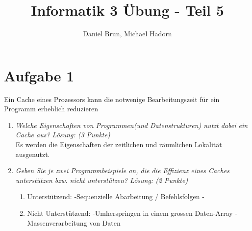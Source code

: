 \documentclass[10pt]{article}
\title{Informatik 3 Übung - Teil 5\vspace{-2ex}}
\author{Daniel Brun, Michael Hadorn\vspace{-2ex}}
\begin{document}
\maketitle

\section*{Aufgabe 1}
Ein Cache eines Prozessors kann die notwenige Bearbeitungszeit für ein Programm erheblich reduzieren
\begin{enumerate}[label=\alph*)]
	\item
		\textit{Welche Eigenschaften von Programmen(und Datenstrukturen) nutzt dabei ein Cache aus? Lösung: (3 Punkte)}\\
		Es werden die Eigenschaften der zeitlichen und räumlichen Lokalität ausgenutzt.
		
		\item 
		\textit{Geben Sie je zwei Programmbeispiele an, die die Effizienz eines Caches unterstützen bzw. nicht unterstützen? Lösung: (2 Punkte)}\\
		\begin{enumerate}
			\item Unterstützend:
				-Sequenzielle Abarbeitung / Befehlsfolgen 
				-
			\item Nicht Unterstützend:
				-Umherspringen in einem grossen Daten-Array
				-Massenverarbeitung von Daten
		\end{enumerate}
\end{enumerate}

\newpage

\end{document}
